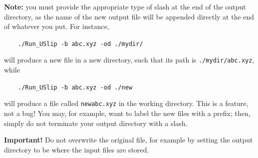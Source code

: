 \documentclass[12pt,twoside]{article}
\begin{document}
\textbf{Note:} you must provide the appropriate type of slash at the end of the output directory, as the name of the new output file will be appended directly at the end of whatever you put. For instance, 

$\quad\quad$\texttt{./Run\_USlip -b abc.xyz -od ./mydir/}

will produce a new file in a new directory, such that its path is \texttt{./mydir/abc.xyz}, while 

$\quad\quad$\texttt{./Run\_USlip -b abc.xyz -od ./new}

will produce a file called \texttt{newabc.xyz} in the working directory. This is a feature, not a bug! You may, for example, want to label the new files with a prefix; then, simply do not terminate your output directory with a slash.

\textbf{Important!} Do not overwrite the original file, for example by setting the output directory to be where the input files are stored.
\end{document}

